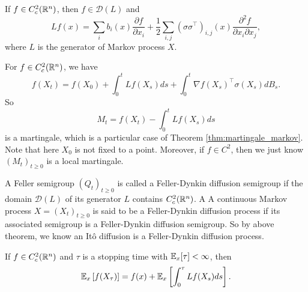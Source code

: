 \begin{thm}
    If $f \in C_c^2(\mathbb{R}^n)$, then $f \in \mathcal{D}(L)$ and
    \begin{equation*}
    	Lf(x) = \sum_i b_i(x) \frac{\partial f}{\partial x_i}+\frac{1}{2} \sum_{i, j}\left(\sigma \sigma^\top\right)_{i, j}(x) \frac{\partial^2 f}{\partial x_i \partial x_j},
    \end{equation*}
    where $L$ is the generator of Markov process $X$.
\end{thm}

\noindent For $f \in C_c^2(\mathbb{R}^n)$, we have
\begin{equation*}
	f(X_t) = f(X_0) + \int_0^t Lf(X_s)ds + \int_0^t \nabla f(X_s)^\top \sigma (X_s) dB_s.
\end{equation*}
So
\begin{equation*}
	M_t = f(X_t) - \int_0^t Lf(X_s)ds
\end{equation*}
is a martingale, which is a particular case of Theorem \ref{thm:martingale_markov}. Note that here $X_0$ is not fixed to a point. Moreover, if $f \in C^2$, then we just know $(M_t)_{t \geq 0}$ is a local martingale.

\begin{rmk}
    A Feller semigroup $(Q_t)_{t \geq 0}$ is called a Feller-Dynkin diffusion semigroup if the domain $\mathcal{D}(L)$ of its generator $L$ contains $C_c^2(\mathbb{R}^n)$. A A continuous Markov process $X=(X_t)_{t \geq 0}$ is said to be a Feller-Dynkin diffusion process if its associated semigroup is a Feller-Dynkin diffusion semigroup. So by above theorem, we know an It\^o diffusion is a Feller-Dynkin diffusion process.
\end{rmk}

\begin{thm}
    If $f \in C_c^2(\mathbb{R}^n)$ and $\tau$ is a stopping time with $\mathbb{E}_x[\tau] < \infty$, then
    \begin{equation*}
    	\mathbb{E}_x\left[f(X_\tau)\right] = f(x) + \mathbb{E}_x\left[\int_0^\tau Lf(X_s)ds\right].
    \end{equation*}
\end{thm}

